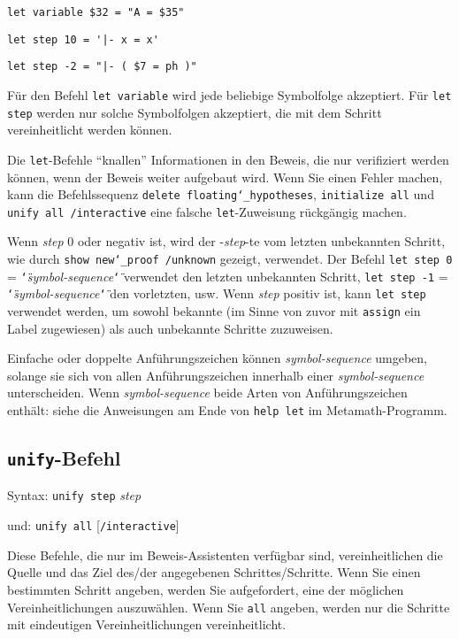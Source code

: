     \verb/let variable $32 = "A = $35"/

    \verb/let step 10 = '|- x = x'/

    \verb/let step -2 = "|- ( $7 = ph )"/

Für den Befehl \texttt{let variable} wird jede beliebige Symbolfolge akzeptiert.  Für \texttt{let step} werden nur solche Symbolfolgen akzeptiert, die mit dem Schritt vereinheitlicht werden können. 

Die \texttt{let}-Befehle "`knallen"' Informationen in den Beweis, die nur verifiziert werden können, wenn der Beweis weiter aufgebaut wird.  Wenn Sie einen \mbox{Fehler} machen, kann die Befehlssequenz \texttt{delete floating{\char`\_}hypotheses},
\texttt{initialize all} und \texttt{unify all /interactive} eine falsche \texttt{let}-Zuweisung rückgängig machen. 

Wenn {\em step} 0 oder negativ ist, wird der -{\em step}-te vom letzten unbekannten Schritt, wie durch \texttt{show new{\char`\_}proof /unknown} gezeigt, verwendet.  Der Befehl \texttt{let step 0} = \texttt{\char`\"}{\em symbol-sequence}\texttt{\char`\"} verwendet den letzten unbekannten Schritt, \texttt{let step -1} = \texttt{\char`\"}{\em symbol-sequence}\texttt{\char`\"} den vorletzten, usw. Wenn {\em step} positiv ist, kann \texttt{let step} verwendet werden, um sowohl bekannte (im Sinne von zuvor mit \texttt{assign} ein Label zugewiesen) als auch unbekannte Schritte zuzuweisen. 

Einfache oder doppelte Anführungszeichen können {\em symbol-sequence} um\-ge\-ben, solange sie sich von allen Anführungszeichen innerhalb einer {\em symbol-sequence} unterscheiden.  Wenn {\em symbol-sequence} beide Arten von Anführungs\-zeichen enthält: siehe die Anweisungen am Ende von \texttt{help let} im Metamath-Programm. 


\subsection{\texttt{unify}-Befehl}

Syntax:  \texttt{unify step} {\em step}

      und:   \texttt{unify all} [\texttt{/interactive}]

Diese Befehle, die nur im Beweis-Assistenten verfügbar sind, vereinheitlichen die Quelle und das Ziel des/der angegebenen Schrittes/Schritte. Wenn Sie einen bestimmten Schritt angeben, werden Sie aufgefordert, eine der möglichen Vereinheitlichungen auszuwählen.  Wenn Sie \texttt{all} angeben, werden nur die Schritte mit eindeutigen Vereinheitlichungen vereinheitlicht. 

